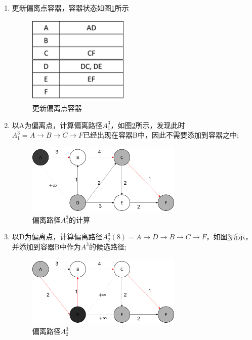 \begin{enumerate}
    \item 更新偏离点容器，容器状态如图\ref{fig:fig21}所示
    \begin{figure}[H] %
        \centering %
        \includegraphics[width=0.45\textwidth]{png/图片21 更新偏离点容器} %
        \caption{更新偏离点容器} %
        \label{fig:fig21} %
    \end{figure}

    \item 以A为偏离点，计算偏离路径$A_1^3$，如图\ref{fig:fig192}所示，发现此时$A_1^3=A\to B\to C \to F$已经出现在容器B中，因此不需要添加到容器之中;
    \begin{figure}[H] %
        \centering %
        \includegraphics[width=0.7\textwidth]{png/图片19偏离路径A2_1的计算} %
        \caption{偏离路径$A_1^3$的计算} %
        \label{fig:fig192} %
    \end{figure}

    \item 以D为偏离点，计算偏离路径$A_2^3(8)=A\to D\to B\to C\to F$，如图\ref{fig:fig27}所示，并添加到容器B中作为$A^3$的候选路径;
    \begin{figure}[H] %
        \centering %
        \includegraphics[width=0.7\textwidth]{png/图片27 偏离路径A3_2} %
        \caption{偏离路径$A^3_2$} %
        \label{fig:fig27} %
    \end{figure}


\end{enumerate}
